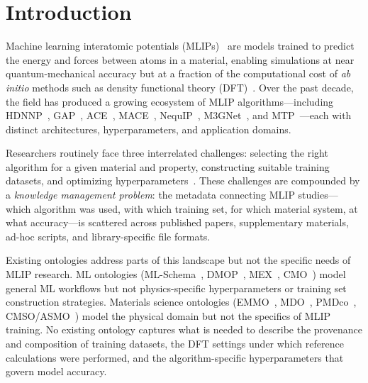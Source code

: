 \section{Introduction}
\label{sec:introduction}

Machine learning interatomic potentials
(MLIPs)~\cite{behler2007hdnnp,bartok2010gap} are models trained to predict the
energy and forces between atoms in a material, enabling simulations at near
quantum-mechanical accuracy but at a fraction of the computational cost of
\emph{ab initio} methods such as density functional theory
(DFT)~\cite{kohn1965dft}. Over the past decade, the field has produced a
growing ecosystem of MLIP algorithms---including
HDNNP~\cite{behler2007hdnnp}, GAP~\cite{bartok2010gap},
ACE~\cite{drautz2019ace}, MACE~\cite{batatia2022mace},
NequIP~\cite{batzner2022nequip}, M3GNet~\cite{chen2022m3gnet}, and
MTP~\cite{shapeev2016mtp}---each with distinct architectures, hyperparameters,
and application domains.

Researchers routinely face three interrelated challenges: selecting the right
algorithm for a given material and property, constructing suitable training
datasets, and optimizing
hyperparameters~\cite{grabowski2024metalearnerc}. These challenges are
compounded by a \emph{knowledge management problem}: the metadata connecting
MLIP studies---which algorithm was used, with which training set, for which
material system, at what accuracy---is scattered across published papers,
supplementary materials, ad-hoc scripts, and library-specific file formats.

Existing ontologies address parts of this landscape but not the specific needs
of MLIP research. ML ontologies (ML-Schema~\cite{publio2018mlschema},
DMOP~\cite{keet2015dmop}, MEX~\cite{esteves2015mex},
CMO~\cite{foltin2024cmo}) model general ML workflows but not
physics-specific hyperparameters or training set construction strategies.
Materials science ontologies (EMMO~\cite{horsch2020emmo},
MDO~\cite{li2024mdo}, PMDco~\cite{bayerlein2024pmdco},
CMSO/ASMO~\cite{menon2024atomrdf}) model the physical domain but not the
specifics of MLIP training. No existing ontology captures what is needed to
describe the provenance and composition of training datasets, the DFT settings
under which reference calculations were performed, and the algorithm-specific
hyperparameters that govern model accuracy.

